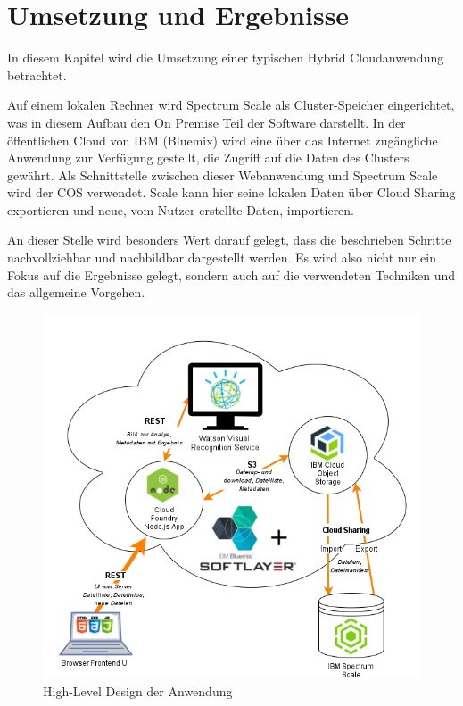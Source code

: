 \chapter{Umsetzung und Ergebnisse}\label{ch:realization}

In diesem Kapitel wird die Umsetzung einer typischen Hybrid Cloudanwendung betrachtet. 

Auf einem lokalen Rechner wird Spectrum Scale als Cluster-Speicher eingerichtet, was in diesem Aufbau den \gls{On Premise} Teil der Software darstellt.
In der öffentlichen Cloud von IBM (Bluemix) wird eine über das Internet zugängliche Anwendung zur Verfügung gestellt, die Zugriff auf die Daten des Clusters gewährt. Als Schnittstelle zwischen dieser Webanwendung und Spectrum Scale wird der \ac{COS} verwendet. Scale kann hier seine lokalen Daten über Cloud Sharing exportieren und neue, vom Nutzer erstellte Daten, importieren.

An dieser Stelle wird besonders Wert darauf gelegt, dass die beschrieben Schritte nachvollziehbar und nachbildbar dargestellt werden. Es wird also nicht nur ein Fokus auf die Ergebnisse gelegt, sondern auch auf die verwendeten Techniken und das allgemeine Vorgehen.

\begin{figure}[hbt]
	\centering
	\includegraphics[scale=0.7]{images/demo-architecture-overview}
	\caption{High-Level Design der Anwendung}
	\label{fig:demoarchitectureoverview}
\end{figure}

